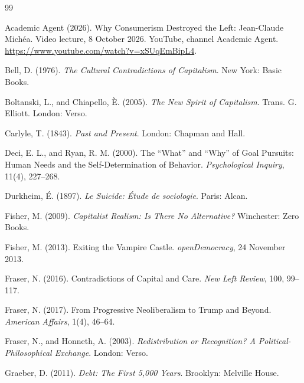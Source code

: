 \documentclass[12pt]{article}
\begin{document}
\begin{thebibliography}{99}
\setlength{\itemsep}{0.4em}

Academic Agent (2026).
\newblock Why Consumerism Destroyed the Left: Jean-Claude Mich\'ea.
\newblock Video lecture, 8 October 2026. YouTube, channel Academic Agent.
\newblock \url{https://www.youtube.com/watch?v=xSUqEmBipL4}.

Bell, D. (1976).
\newblock \emph{The Cultural Contradictions of Capitalism}.
\newblock New York: Basic Books.

Boltanski, L., and Chiapello, \`E. (2005).
\newblock \emph{The New Spirit of Capitalism}.
\newblock Trans. G. Elliott. London: Verso.

Carlyle, T. (1843).
\newblock \emph{Past and Present}.
\newblock London: Chapman and Hall.

Deci, E. L., and Ryan, R. M. (2000).
\newblock The ``What'' and ``Why'' of Goal Pursuits: Human Needs and the Self-Determination of Behavior.
\newblock \emph{Psychological Inquiry}, 11(4), 227--268.

Durkheim, \'E. (1897).
\newblock \emph{Le Suicide: \'Etude de sociologie}.
\newblock Paris: Alcan.

Fisher, M. (2009).
\newblock \emph{Capitalist Realism: Is There No Alternative?}
\newblock Winchester: Zero Books.

Fisher, M. (2013).
\newblock Exiting the Vampire Castle.
\newblock \emph{openDemocracy}, 24 November 2013.

Fraser, N. (2016).
\newblock Contradictions of Capital and Care.
\newblock \emph{New Left Review}, 100, 99--117.

Fraser, N. (2017).
\newblock From Progressive Neoliberalism to Trump and Beyond.
\newblock \emph{American Affairs}, 1(4), 46--64.

Fraser, N., and Honneth, A. (2003).
\newblock \emph{Redistribution or Recognition? A Political-Philosophical Exchange}.
\newblock London: Verso.

Graeber, D. (2011).
\newblock \emph{Debt: The First 5,000 Years}.
\newblock Brooklyn: Melville House.


\end{thebibliography}
\end{document}
